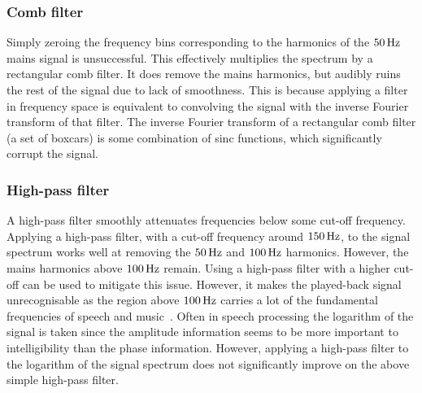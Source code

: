 \documentclass[paper-main.tex]{subfiles}
\begin{document}
\subsubsection{Comb filter}

Simply zeroing the frequency bins corresponding to the harmonics of the $50\,{\rm Hz}$ mains signal is unsuccessful. This effectively multiplies the spectrum by a rectangular comb filter. It does remove the mains harmonics, but audibly ruins the rest of the signal due to lack of smoothness. This is because applying a filter in frequency space is equivalent to convolving the signal with the inverse Fourier transform of that filter. The inverse Fourier transform of a rectangular comb filter (a set of boxcars) is some combination of sinc functions, which significantly corrupt the signal. 


\subsubsection{High-pass filter}

A high-pass filter smoothly attenuates frequencies below some cut-off frequency. Applying a high-pass filter, with a cut-off frequency around $150\,{\rm Hz}$, to the signal spectrum works well at removing the $50\,{\rm Hz}$ and $100\,{\rm Hz}$ harmonics. However, the mains harmonics above $100\,{\rm Hz}$ remain. Using a high-pass filter with a higher cut-off can be used to mitigate this issue. However, it makes the played-back signal unrecognisable as the region above $100\,{\rm Hz}$ carries a lot of the fundamental frequencies of speech and music~\cite{speech_intelligibility}.
Often in speech processing the logarithm of the signal is taken since the amplitude information seems to be more important to intelligibility than the phase information. However, applying a high-pass filter to the logarithm of the signal spectrum does not significantly improve on the above simple high-pass filter.

\end{document}
